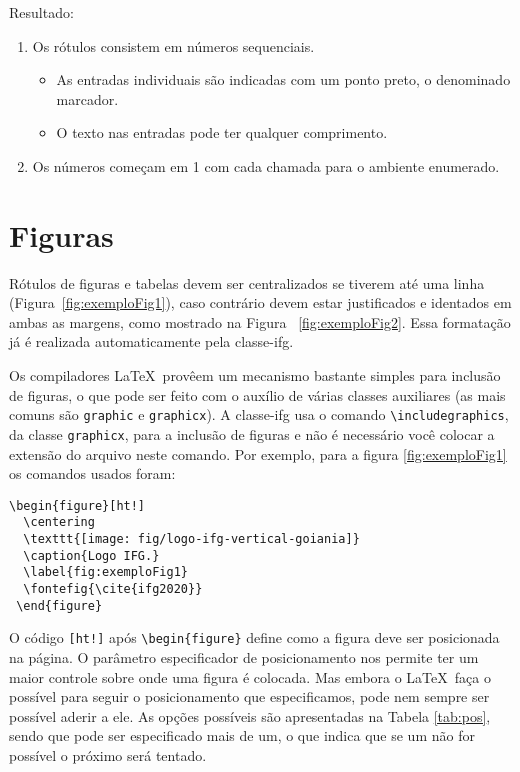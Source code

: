 Resultado:

\begin{enumerate}
    \item Os rótulos consistem em números sequenciais.
    \begin{itemize}
      \item As entradas individuais são indicadas com um ponto preto, o denominado marcador.
      \item O texto nas entradas pode ter qualquer comprimento.
    \end{itemize}
    \item Os números começam em 1 com cada chamada para o ambiente enumerado.
\end{enumerate}

\section{Figuras}
\label{sec:figs} 
Rótulos de figuras e tabelas devem ser centralizados se tiverem até uma linha (Figura~\ref{fig:exemploFig1}), caso contrário devem estar justificados e identados em ambas as margens, como mostrado na Figura ~\ref{fig:exemploFig2}. Essa formatação já é realizada automaticamente pela \textsf{classe-ifg}.

Os compiladores \LaTeX\ provêem um mecanismo bastante simples para inclusão de figuras, o que pode ser feito com o auxílio de várias classes auxiliares (as mais comuns são \verb|graphic| e \verb|graphicx|). A \textsf{classe-ifg} usa o comando \verb|\includegraphics|, da classe \verb|graphicx|, para a inclusão de figuras e não é necessário você colocar a extensão do arquivo neste comando. Por exemplo, para a figura \ref{fig:exemploFig1} os comandos usados foram:

\begin{verbatim}
\begin{figure}[ht!]
  \centering
  \texttt{[image: fig/logo-ifg-vertical-goiania]}
  \caption{Logo IFG.}
  \label{fig:exemploFig1}
  \fontefig{\cite{ifg2020}}
 \end{figure}
\end{verbatim}

O código \verb|[ht!]| após \verb|\begin{figure}| define como a figura deve ser posicionada na página. O parâmetro especificador de posicionamento nos permite ter um maior controle sobre onde uma figura é colocada. Mas embora o \LaTeX\ faça o possível para seguir o posicionamento que especificamos, pode nem sempre ser possível aderir a ele. As opções possíveis são apresentadas na Tabela \ref{tab:pos}, sendo que pode ser especificado mais de um, o que indica que se um não for possível o próximo será tentado.

